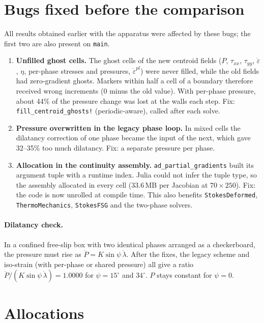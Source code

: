 \documentclass[11pt,a4paper]{article}
\newcommand{\epsd}{\dot{\varepsilon}}
\begin{document}
\section{Bugs fixed before the comparison}

All results obtained earlier with the apparatus were affected by these bugs; the first two are also present on \texttt{main}.

\begin{enumerate}
\item \textbf{Unfilled ghost cells.} The ghost cells of the new centroid fields ($P$, $\tau_{xx}$, $\tau_{yy}$, $\epsd$, $\eta$, per-phase stresses and pressures, $\epsd^{pl}$) were never filled, while the old fields had zero-gradient ghosts. Markers within half a cell of a boundary therefore received wrong increments (0 minus the old value). With per-phase pressure, about 44\% of the pressure change was lost at the walls each step. Fix: \texttt{fill\_centroid\_ghosts!} (periodic-aware), called after each solve.
\item \textbf{Pressure overwritten in the legacy phase loop.} In mixed cells the dilatancy correction of one phase became the input of the next, which gave 32--35\% too much dilatancy. Fix: a separate pressure per phase.
\item \textbf{Allocation in the continuity assembly.} \texttt{ad\_partial\_gradients} built its argument tuple with a runtime index. Julia could not infer the tuple type, so the assembly allocated in every cell (33.6\,MB per Jacobian at $70\times250$). Fix: the code is now unrolled at compile time. This also benefits \texttt{StokesDeformed}, \texttt{ThermoMechanics}, \texttt{StokesFSG} and the two-phase solvers.
\end{enumerate}

\paragraph{Dilatancy check.} In a confined free-slip box with two identical phases arranged as a checkerboard, the pressure must rise as $\dot P = K\sin\psi\,\dot\lambda$. After the fixes, the legacy scheme and iso-strain (with per-phase or shared pressure) all give a ratio $\dot P/(K\sin\psi\,\dot\lambda)=1.0000$ for $\psi=15^\circ$ and $34^\circ$. $P$ stays constant for $\psi=0$.

\section{Allocations}
\end{document}
